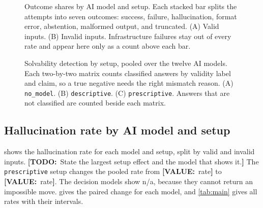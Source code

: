 \documentclass[10pt,twocolumn,letterpaper]{article}
\newcommand{\todo}[1]{{\color{red!70!black}\textbf{[TODO:}~#1\textbf{]}}}
\newcommand{\val}[1]{{\color{red!70!black}\textbf{[VALUE:}~#1\textbf{]}}}
\newcommand{\code}[1]{\texttt{#1}}
\begin{document}
\begin{figure}[t]
\begin{phcanvas}
\end{phcanvas}
\caption{Outcome shares by AI model and setup. Each stacked bar splits the attempts into seven outcomes: success, failure, hallucination, format error, abstention, malformed output, and truncated. (A) Valid inputs. (B) Invalid inputs. Infrastructure failures stay out of every rate and appear here only as a count above each bar.}
\label{fig:outcomes}
\end{figure}

\begin{figure}[t]
\begin{phcanvas}
\end{phcanvas}
\caption{Solvability detection by setup, pooled over the twelve AI models. Each two-by-two matrix counts classified answers by validity label and claim, so a true negative needs the right mismatch reason. (A) \code{no\_model}. (B) \code{descriptive}. (C) \code{prescriptive}. Answers that are not classified are counted beside each matrix.}
\label{fig:confusion}
\end{figure}

\subsection{Hallucination rate by AI model and setup}\label{sec:res-hallucination}
 shows the hallucination rate for each model and setup, split by valid and invalid inputs. \todo{State the largest setup effect and the model that shows it.} The \code{prescriptive} setup changes the pooled rate from \val{rate} to \val{rate}. The decision models show n/a, because they cannot return an impossible move.  gives the paired change for each model, and \cref{tab:main} gives all rates with their intervals.
\end{document}
